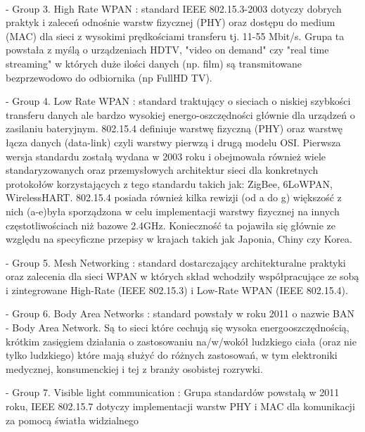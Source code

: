 \\
\par- Group 3. High Rate WPAN : standard IEEE 802.15.3-2003 dotyczy dobrych praktyk i zaleceń odnośnie warstw fizycznej (PHY) oraz dostępu do medium (MAC) dla sieci z wysokimi prędkościami transferu tj. 11-55 Mbit/s. Grupa ta powstała z myślą o urządzeniach HDTV, "video on demand" czy "real time streaming" w których duże ilości danych (np. film) są transmitowane bezprzewodowo do odbiornika (np FullHD TV).
\\
\par- Group 4. Low Rate WPAN : standard traktujący o sieciach o niskiej szybkości transferu danych ale bardzo wysokiej energo-oszczędności głównie dla urządzeń o zasilaniu bateryjnym. 802.15.4 definiuje warstwę fizyczną (PHY) oraz warstwę łącza danych (data-link) czyli warstwy pierwzą i drugą modelu OSI. Pierwsza wersja standardu zostałą wydana w 2003 roku i obejmowała również wiele standaryzowanych oraz przemysłowych architektur sieci dla konkretnych protokołów korzystających z tego standardu takich jak:  ZigBee, 6LoWPAN, WirelessHART.
802.15.4 posiada również kilka rewizji (od a do g) większość z nich (a-e)była sporządzona w celu implementacji warstwy fizycznej na innych częstotliwościach niż bazowe 2.4GHz. Konieczność ta pojawiła się głównie ze względu na specyficzne przepisy w krajach takich jak Japonia, Chiny czy Korea.
\\
\par- Group 5. Mesh Networking : standard dostarczający architekturalne praktyki oraz zalecenia dla sieci WPAN w których skład wchodziły współpracujące ze sobą i zintegrowane High-Rate (IEEE 802.15.3) i Low-Rate WPAN (IEEE 802.15.4). 
\\
\par- Group 6. Body Area Networks : standard powstały w roku 2011 o nazwie BAN - Body Area Network. Są to sieci które cechują się wysoka energooszczędnością, krótkim zasięgiem działania o zastosowaniu na/w/wokół ludzkiego ciała (oraz nie tylko ludzkiego) które mają służyć do różnych zastosowań, w tym elektroniki medycznej, konsumenckiej i tej z branży osobistej rozrywki.
\\
\par- Group 7. Visible light communication : Grupa standardów powstałą w 2011 roku, IEEE 802.15.7 dotyczy implementacji warstw PHY i MAC dla komunikacji za pomocą światła widzialnego


\clearpage 